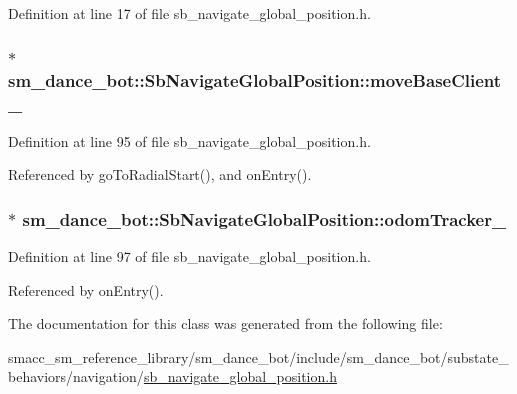Definition at line 17 of file sb\+\_\+navigate\+\_\+global\+\_\+position.\+h.

\subsubsection[{\texorpdfstring{move\+Base\+Client\+\_\+}{moveBaseClient_}}]{$\ast$ sm\+\_\+dance\+\_\+bot\+::\+Sb\+Navigate\+Global\+Position\+::move\+Base\+Client\+\_\+\hspace{0.3cm}{\ttfamily [private]}}\hypertarget{classsm__dance__bot_1_1SbNavigateGlobalPosition_a61ddf443ec0ccc460ae594d35c50ac7f}{}\label{classsm__dance__bot_1_1SbNavigateGlobalPosition_a61ddf443ec0ccc460ae594d35c50ac7f}


Definition at line 95 of file sb\+\_\+navigate\+\_\+global\+\_\+position.\+h.



Referenced by go\+To\+Radial\+Start(), and on\+Entry().

\subsubsection[{\texorpdfstring{odom\+Tracker\+\_\+}{odomTracker_}}]{$\ast$ sm\+\_\+dance\+\_\+bot\+::\+Sb\+Navigate\+Global\+Position\+::odom\+Tracker\+\_\+\hspace{0.3cm}{\ttfamily [private]}}\hypertarget{classsm__dance__bot_1_1SbNavigateGlobalPosition_a71058189c1f73baf77073ff1a64ff5ea}{}\label{classsm__dance__bot_1_1SbNavigateGlobalPosition_a71058189c1f73baf77073ff1a64ff5ea}


Definition at line 97 of file sb\+\_\+navigate\+\_\+global\+\_\+position.\+h.



Referenced by on\+Entry().



The documentation for this class was generated from the following file\+:\begin{DoxyCompactItemize}
\item 
smacc\+\_\+sm\+\_\+reference\+\_\+library/sm\+\_\+dance\+\_\+bot/include/sm\+\_\+dance\+\_\+bot/substate\+\_\+behaviors/navigation/\hyperlink{sb__navigate__global__position_8h}{sb\+\_\+navigate\+\_\+global\+\_\+position.\+h}\end{DoxyCompactItemize}
